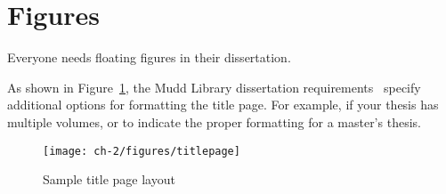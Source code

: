\section{Figures}
\label{sec:pastwork:figures}

Everyone needs floating figures in their dissertation.

As shown in Figure~\ref{fig:pastwork:titlepage}, the Mudd Library dissertation requirements~\cite{muddthesis2009} specify additional options for formatting the title page. For example, if your thesis has multiple volumes, or to indicate the proper formatting for a master's thesis.

\begin{figure}[htb]
  \begin{center}
    \texttt{[image: ch-2/figures/titlepage]}
    \caption[Sample Title Page Layout]{Sample title page layout~\cite{muddthesis2009}}
    \label{fig:pastwork:titlepage}
  \end{center}
\end{figure}

